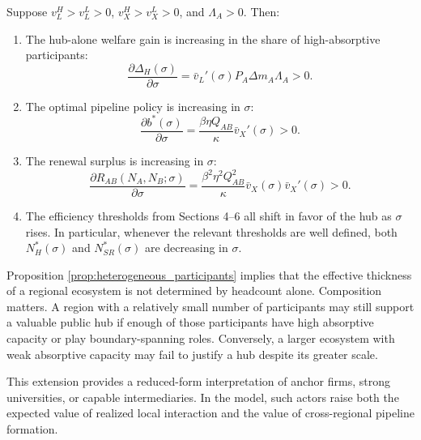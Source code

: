 \begin{proposition}
\label{prop:heterogeneous_participants}
Suppose $v_L^H>v_L^L>0$, $v_X^H>v_X^L>0$, and $\Lambda_A>0$. Then:

\begin{enumerate}[leftmargin=2em]
    \item The hub-alone welfare gain is increasing in the share of high-absorptive participants:
    \begin{equation}
    \frac{\partial \Delta_H(\sigma)}{\partial \sigma}
    =
    \bar v_L'(\sigma)P_A\Delta m_A\Lambda_A
    >0.
    \label{eq:dDeltaH_dsigma}
    \end{equation}

    \item The optimal pipeline policy is increasing in $\sigma$:
    \begin{equation}
    \frac{\partial b^*(\sigma)}{\partial \sigma}
    =
    \frac{\beta\eta Q_{AB}}{\kappa}\bar v_X'(\sigma)
    >0.
    \label{eq:dbstar_dsigma}
    \end{equation}

    \item The renewal surplus is increasing in $\sigma$:
    \begin{equation}
    \frac{\partial R_{AB}(N_A,N_B;\sigma)}{\partial \sigma}
    =
    \frac{\beta^2\eta^2Q_{AB}^2}{\kappa}
    \bar v_X(\sigma)\bar v_X'(\sigma)
    >0.
    \label{eq:dR_dsigma}
    \end{equation}

    \item The efficiency thresholds from Sections 4--6 all shift in favor of the hub as $\sigma$ rises. In particular, whenever the relevant thresholds are well defined, both $N_H^*(\sigma)$ and $N_{SR}^*(\sigma)$ are decreasing in $\sigma$.
\end{enumerate}
\end{proposition}

Proposition \ref{prop:heterogeneous_participants} implies that the effective thickness of a regional ecosystem is not determined by headcount alone. Composition matters. A region with a relatively small number of participants may still support a valuable public hub if enough of those participants have high absorptive capacity or play boundary-spanning roles. Conversely, a larger ecosystem with weak absorptive capacity may fail to justify a hub despite its greater scale.

This extension provides a reduced-form interpretation of anchor firms, strong universities, or capable intermediaries. In the model, such actors raise both the expected value of realized local interaction and the value of cross-regional pipeline formation.

